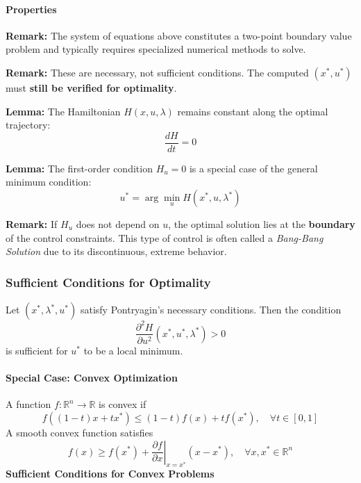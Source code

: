 \paragraph{Properties}
\textbf{Remark:} The system of equations above constitutes a two-point boundary value problem and typically requires specialized numerical methods to solve.

\newpar{}
\textbf{Remark:} These are necessary, not sufficient conditions. The computed $(x^*, u^*)$ must \textbf{still be verified for optimality}.

\newpar{}
\textbf{Lemma:} The Hamiltonian $H(x, u, \lambda)$ remains constant along the optimal trajectory:
\begin{equation*}
    \frac{dH}{dt} = 0
\end{equation*}

\newpar{}
\textbf{Lemma:} The first-order condition $H_u = 0$ is a special case of the general minimum condition:
\begin{equation*}
    u^* = \arg\min_u H(x^*, u, \lambda^*)
\end{equation*}

\newpar{}
\textbf{Remark:} If $H_u$ does not depend on $u$, the optimal solution lies at the \textbf{boundary} of the control constraints. This type of control is often called a \emph{Bang-Bang Solution} due to its discontinuous, extreme behavior.

\subsubsection{Sufficient Conditions for Optimality}
Let $(x^*, \lambda^*, u^*)$ satisfy Pontryagin's necessary conditions. Then the condition
\begin{equation*}
    \frac{\partial^2 H}{\partial u^2}(x^*, u^*, \lambda^*) > 0
\end{equation*}
is sufficient for $u^*$ to be a local minimum.

\paragraph{Special Case: Convex Optimization}

A function $f : \mathbb{R}^n \to \mathbb{R}$ is convex if
\begin{equation*}
    f((1 - t)x + t x^*) \leq (1 - t) f(x) + t f(x^*), \quad \forall t \in [0, 1]
\end{equation*}
\newpar{}
A smooth convex function satisfies
\begin{equation*}
    f(x) \geq f(x^*) + \left. \frac{\partial f}{\partial x} \right|_{x = x^*}(x - x^*), \quad \forall x, x^* \in \mathbb{R}^n
\end{equation*}
\newpar{}
\textbf{Sufficient Conditions for Convex Problems}

